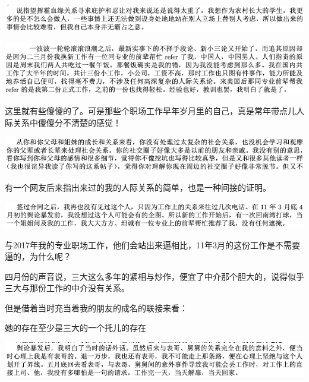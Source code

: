 \documentclass[9pt, b5paper]{article}
\begin{document}
\begin{center}
\includegraphics[width=.9\linewidth]{./pic/backups_plans_20210412_114004.png}
\end{center}

\begin{center}
\includegraphics[width=.9\linewidth]{./pic/backups_plans_20210412_114144.png}
\end{center}

这里就有些傻傻的了。可是那些个职场工作早年岁月里的自己，真是常年带点儿人际关系中傻傻分不清楚的感觉！

\begin{center}
\includegraphics[width=.9\linewidth]{./pic/backups_plans_20210412_114502.png}
\end{center}

有一个网友后来指出来过的我的人际关系的简单，也是一种间接的证明。 

\begin{center}
\includegraphics[width=.9\linewidth]{./pic/backups_plans_20210412_104824.png}
\end{center}

与2017年我的专业职场工作，他们会站出来逼相比，11年3月的这份工作是不需要逼的，为什么呢？

四月份的声音说，三大这么多年的紧相与炒作，便宜了中介那个胆大的，说得似乎三大与那份工作的中介没有关系。

但是借着当时充当着我的朋友的成名的联接来看：

她的存在至少是三大的一个托儿的存在

\begin{center}
\includegraphics[width=.9\linewidth]{./pic/backups_plans_20210412_104930.png}
\end{center}
\end{document}
